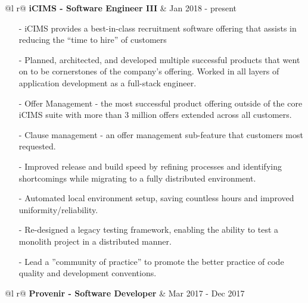 \documentclass[a4paper,11pt]{article}
\begin{document}
\begin{tabularx}{\linewidth}{ @{}l r@{} }
\textbf{iCIMS - Software Engineer III} & \hfill Jan 2018 - present \\[3.75pt]
 {
\begin{minipage}[t]{\linewidth}
    \begin{itemize}[nosep,after=\strut, leftmargin=1em, itemsep=3pt]
        \item[-] iCIMS provides a best-in-class recruitment software offering that assists in reducing the “time to hire” of customers
        \item[-] Planned, architected, and developed multiple successful products that went on to be cornerstones of the company's offering. Worked in all layers of application development as a full-stack engineer.
        \item[-] Offer Management - the most successful product offering outside of the core iCIMS suite with more than 3 million offers extended across all customers.
        \item[-] Clause management - an offer management sub-feature that customers most requested.
        \item[-] Improved release and build speed by refining processes and identifying shortcomings while migrating to a fully distributed environment.
        \item[-] Automated local environment setup, saving countless hours and improved uniformity/reliability.
        \item[-] Re-designed a legacy testing framework, enabling the ability to test a monolith project in a distributed manner.
        \item[-] Lead a ”community of practice” to promote the better practice of code quality and development conventions.
    \end{itemize}
    \end{minipage}
    }
\end{tabularx}

\begin{tabularx}{\linewidth}{ @{}l r@{} }
\textbf{Provenir - Software Developer} & \hfill Mar 2017 - Dec 2017 \\[3.75pt]
\end{tabularx}
\end{document}
